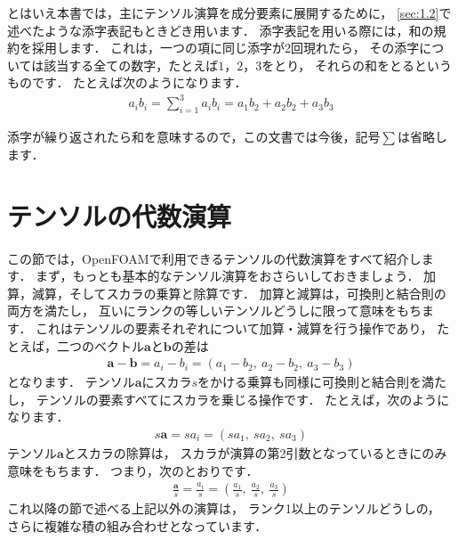 とはいえ本書では，主にテンソル演算を成分要素に展開するために，
\autoref{sec:1.2}で述べたような添字表記もときどき用います．
添字表記を用いる際には，和の規約を採用します．
これは，一つの項に同じ添字が2回現れたら，
その添字については該当する全ての数字，たとえば$1$，$2$，$3$をとり，
それらの和をとるというものです．
たとえば次のようになります．
\begin{align}
 \label{eq:1.3}
 a_{i}b_{i} = \sum^{3}_{i=1}a_{i}b_{i} = a_{1}b_{2} + a_{2}b_{2} + a_{3}b_{3}
\end{align}

添字が繰り返されたら和を意味するので，この文書では今後，記号$\sum$は省略します．



\section{テンソルの代数演算}
\label{sec:1.3}
この節では，OpenFOAMで利用できるテンソルの代数演算をすべて紹介します．
まず，もっとも基本的なテンソル演算をおさらいしておきましょう．
加算，減算，そしてスカラの乗算と除算です．
加算と減算は，可換則と結合則の両方を満たし，
互いにランクの等しいテンソルどうしに限って意味をもちます．
これはテンソルの要素それぞれについて加算・減算を行う操作であり，
たとえば，二つのベクトル$\bm{a}$と$\bm{b}$の差は
\begin{align}
 \label{eq:1.4}
 \bm{a} - \bm{b} = a_{i} - b_{i} = (a_{1} - b_{2},\ a_{2} - b_{2},\ a_{3} - b_{3})
\end{align}
となります．
テンソル$\bm{a}$にスカラ$s$をかける乗算も同様に可換則と結合則を満たし，
テンソルの要素すべてにスカラを乗じる操作です．
たとえば，次のようになります．
\begin{align}
 \label{eq:1.5}
 s\bm{a} = sa_{i} = (sa_{1},\ sa_{2},\ sa_{3})
\end{align}
テンソル$\bm{a}$とスカラの除算は，
スカラが演算の第2引数となっているときにのみ意味をもちます．
つまり，次のとおりです．
\begin{align}
 \label{eq:1.6}
 \frac{\bm{a}}{s} = \frac{a_{i}}{s}
 = \left(\frac{a_{1}}{s},\ \frac{a_{2}}{s},\ \frac{a_{3}}{s}\right)
\end{align}
これ以降の節で述べる上記以外の演算は，
ランク1以上のテンソルどうしの，
さらに複雑な積の組み合わせとなっています．


